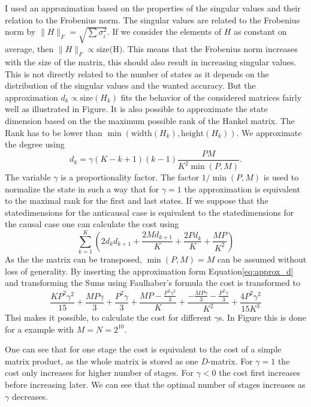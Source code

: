 \documentclass[doctype=mastersthesis,BCOR=15mm,biblatex]{ldvbook}%
\begin{document}
I used an approximation based on the properties of the singular values and their relation to the Frobenius norm.
The singular values are related to the Frobenius norm by $\|H\|_F = \sqrt{\sum \sigma_i^2}$.
If we consider the elements of $H$ as constant on average, then $\|H\|_F \propto \text{size(H)}$.
This means that the Frobenius norm increases with the size of the matrix, this should also result in increasing singular values.
This is not directly related to the number of states as it depends on the distribution of the singular values and the wanted accuracy.
But the approximation $d_k \propto \text{size}(H_k)$ fits the behavior of the considered matrices fairly well as illustrated in Figure.
It is also possible to approximate the state dimension based on the the maximum possible rank of the Hankel matrix.
The Rank has to be lower than $\min(\text{width}(H_k),\text{height}(H_k))$.
We approximate the degree using
\begin{equation}\label{eq:approx_d}
	d_k = \gamma (K-k+1)(k-1)\frac{PM}{K^2\min(P,M)}.
\end{equation}
The variable $\gamma$ is a proportionality factor.
The factor $1/\min(P,M)$ is used to normalize the state in such a way that for $\gamma = 1$ the approximation is equivalent to the maximal rank for the first and last states. 
If we suppose that the statedimensions for the anticausal case is equivalent to the statedimensions for the causal case one can calculate the cost using
\begin{equation}
\sum_{k=1}^{K} \left(2 d_{k} d_{k+1} + \frac{2 M d_{k+1}}{K} + \frac{2 P d_{k}}{K} + \frac{M P}{K^{2}}\right)
\end{equation}
As the the matrix can be transposed, $\min(P,M)=M$ can be assumed without loss of generality.
By inserting the approximation form Equation\ref{eq:approx_d} and transforming the Sums using Faulhaber's formula \cite{knuth_johann_1993} the cost is transformed to
\begin{equation}
 \frac{K P^{2} \gamma^{2}}{15} + \frac{M P \gamma}{3} + \frac{P^{2} \gamma}{3} + \frac{M P - \frac{P^{2} \gamma^{2}}{3}}{K} + \frac{- \frac{M P \gamma}{3} - \frac{P^{2} \gamma}{3}}{K^{2}} + \frac{4 P^{2} \gamma^{2}}{15 K^{3}}
\end{equation}
Thsi makes it possible, to calculate the cost for different $\gamma$s.
In Figure%
this is done for a example with $M=N = 2^{10}$.

One can see that for one stage the cost is equivalent to the cost of a simple matrix product, as the whole matrix is stored as one $D$-matrix.
For $\gamma = 1$ the cost only increases for higher number of stages.
For $\gamma < 0$ the cost first increases before increasing later. 
We can see that the optimal number of stages increases as $\gamma$ decreases.
\end{document}
